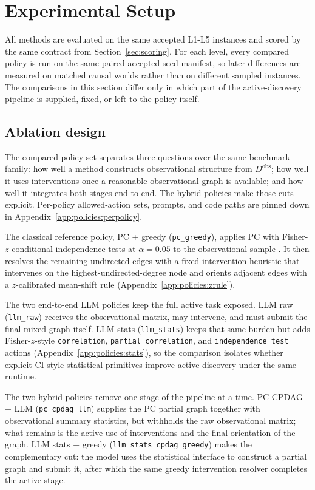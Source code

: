 \section{Experimental Setup}
\label{sec:agents}

All methods are evaluated on the same accepted L1-L5 instances and scored by the same contract from Section~\ref{sec:scoring}. For each level, every compared policy is run on the same paired accepted-seed manifest, so later differences are measured on matched causal worlds rather than on different sampled instances. The comparisons in this section differ only in which part of the active-discovery pipeline is supplied, fixed, or left to the policy itself.

\subsection{Ablation design}

The compared policy set separates three questions over the same benchmark family: how well a method constructs observational structure from $D^{\mathrm{obs}}$; how well it uses interventions once a reasonable observational graph is available; and how well it integrates both stages end to end. The hybrid policies make those cuts explicit. Per-policy allowed-action sets, prompts, and code paths are pinned down in Appendix~\ref{app:policies:perpolicy}.

The classical reference policy, PC + greedy (\texttt{pc\_greedy}), applies PC with Fisher-$z$ conditional-independence tests at $\alpha=0.05$ to the observational sample \citep{spirtes2000causation}. It then resolves the remaining undirected edges with a fixed intervention heuristic that intervenes on the highest-undirected-degree node and orients adjacent edges with a $z$-calibrated mean-shift rule (Appendix~\ref{app:policies:zrule}).

The two end-to-end LLM policies keep the full active task exposed. LLM raw (\texttt{llm\_raw}) receives the observational matrix, may intervene, and must submit the final mixed graph itself. LLM stats (\texttt{llm\_stats}) keeps that same burden but adds Fisher-$z$-style \texttt{correlation}, \texttt{partial\_correlation}, and \texttt{independence\_test} actions (Appendix~\ref{app:policies:stats}), so the comparison isolates whether explicit CI-style statistical primitives improve active discovery under the same runtime.

The two hybrid policies remove one stage of the pipeline at a time. PC CPDAG + LLM (\texttt{pc\_cpdag\_llm}) supplies the PC partial graph together with observational summary statistics, but withholds the raw observational matrix; what remains is the active use of interventions and the final orientation of the graph. LLM stats + greedy (\texttt{llm\_stats\_cpdag\_greedy}) makes the complementary cut: the model uses the statistical interface to construct a partial graph and submit it, after which the same greedy intervention resolver completes the active stage.

